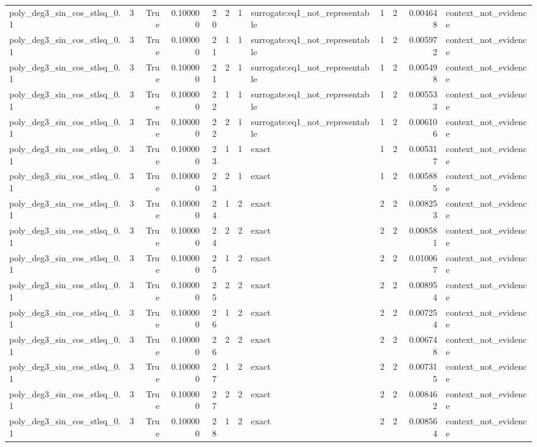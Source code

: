 \begin{tabular}{lrrrrrrlrrrl}
poly\_deg3\_sin\_cos\_stlsq\_0.1 & 3 & True & 0.100000 & 20 & 2 & 1 & surrogate:eq1\_not\_representable & 1 & 2 & 0.004648 & context\_not\_evidence \\
poly\_deg3\_sin\_cos\_stlsq\_0.1 & 3 & True & 0.100000 & 21 & 1 & 1 & surrogate:eq1\_not\_representable & 1 & 2 & 0.005972 & context\_not\_evidence \\
poly\_deg3\_sin\_cos\_stlsq\_0.1 & 3 & True & 0.100000 & 21 & 2 & 1 & surrogate:eq1\_not\_representable & 1 & 2 & 0.005498 & context\_not\_evidence \\
poly\_deg3\_sin\_cos\_stlsq\_0.1 & 3 & True & 0.100000 & 22 & 1 & 1 & surrogate:eq1\_not\_representable & 1 & 2 & 0.005533 & context\_not\_evidence \\
poly\_deg3\_sin\_cos\_stlsq\_0.1 & 3 & True & 0.100000 & 22 & 2 & 1 & surrogate:eq1\_not\_representable & 1 & 2 & 0.006106 & context\_not\_evidence \\
poly\_deg3\_sin\_cos\_stlsq\_0.1 & 3 & True & 0.100000 & 23 & 1 & 1 & exact & 1 & 2 & 0.005317 & context\_not\_evidence \\
poly\_deg3\_sin\_cos\_stlsq\_0.1 & 3 & True & 0.100000 & 23 & 2 & 1 & exact & 1 & 2 & 0.005885 & context\_not\_evidence \\
poly\_deg3\_sin\_cos\_stlsq\_0.1 & 3 & True & 0.100000 & 24 & 1 & 2 & exact & 2 & 2 & 0.008253 & context\_not\_evidence \\
poly\_deg3\_sin\_cos\_stlsq\_0.1 & 3 & True & 0.100000 & 24 & 2 & 2 & exact & 2 & 2 & 0.008581 & context\_not\_evidence \\
poly\_deg3\_sin\_cos\_stlsq\_0.1 & 3 & True & 0.100000 & 25 & 1 & 2 & exact & 2 & 2 & 0.010067 & context\_not\_evidence \\
poly\_deg3\_sin\_cos\_stlsq\_0.1 & 3 & True & 0.100000 & 25 & 2 & 2 & exact & 2 & 2 & 0.008954 & context\_not\_evidence \\
poly\_deg3\_sin\_cos\_stlsq\_0.1 & 3 & True & 0.100000 & 26 & 1 & 2 & exact & 2 & 2 & 0.007254 & context\_not\_evidence \\
poly\_deg3\_sin\_cos\_stlsq\_0.1 & 3 & True & 0.100000 & 26 & 2 & 2 & exact & 2 & 2 & 0.006748 & context\_not\_evidence \\
poly\_deg3\_sin\_cos\_stlsq\_0.1 & 3 & True & 0.100000 & 27 & 1 & 2 & exact & 2 & 2 & 0.007315 & context\_not\_evidence \\
poly\_deg3\_sin\_cos\_stlsq\_0.1 & 3 & True & 0.100000 & 27 & 2 & 2 & exact & 2 & 2 & 0.008462 & context\_not\_evidence \\
poly\_deg3\_sin\_cos\_stlsq\_0.1 & 3 & True & 0.100000 & 28 & 1 & 2 & exact & 2 & 2 & 0.008564 & context\_not\_evidence \\

\end{tabular}
